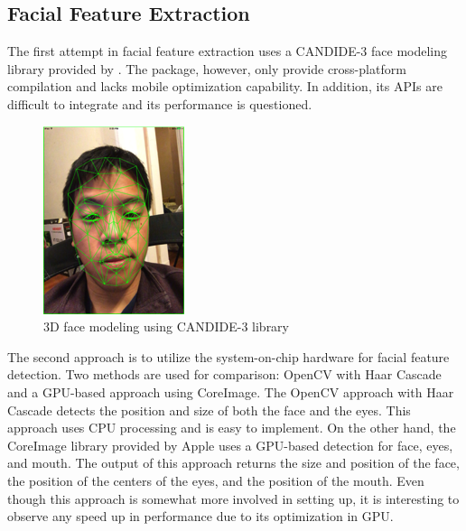 \documentclass[10pt,twocolumn,letterpaper]{article}
\begin{document}
\subsection{Facial Feature Extraction}
The first attempt in facial feature extraction uses a CANDIDE-3 face modeling library provided by \cite{candide}.  The package, however, only provide cross-platform compilation and lacks mobile optimization capability.  In addition, its APIs are difficult to integrate and its performance is questioned.
\begin{figure}[h]
\begin{center}
\includegraphics[width=0.4\linewidth]{candide-3.png}
\end{center}
   \caption{3D face modeling using CANDIDE-3 library}
\label{candide}
\end{figure}

The second approach is to utilize the system-on-chip hardware for facial feature detection.  Two methods are used for comparison: OpenCV with Haar Cascade and a GPU-based approach using CoreImage. The OpenCV approach with Haar Cascade detects the position and size of both the face and the eyes.  This approach uses CPU processing and is easy to implement.  On the other hand, the CoreImage library provided by Apple uses a GPU-based detection for face, eyes, and mouth.  The output of this approach returns the size and position of the face, the position of the centers of the eyes, and the position of the mouth. Even though this approach is somewhat more involved in setting up, it is interesting to observe any speed up in performance due to its optimization in GPU.
\end{document}
